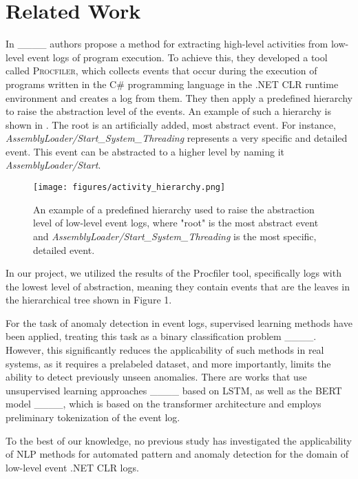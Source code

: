 \section{Related Work}
\label{sec:related}

In ____ authors propose a method for extracting high-level activities from low-level event logs of program execution. To achieve this, they developed a tool called \textsc{Procfiler}, which collects events that occur during the execution of programs written in the C\# programming language in the .NET CLR runtime environment and creates a log from them. They then apply a predefined hierarchy to raise the abstraction level of the events. An example of such a hierarchy is shown in . The root is an artificially added, most abstract event. For instance, \textit{AssemblyLoader/Start\_System\_Threading} represents a very specific and detailed event. This event can be abstracted to a higher level by naming it \textit{AssemblyLoader/Start}.

\begin{figure}
  \centering
  \texttt{[image: figures/activity\_hierarchy.png]}
  \caption{An example of a predefined hierarchy used to raise the abstraction level of low-level event logs, where "root" is the most abstract event and \textit{AssemblyLoader/Start\_System\_Threading} is the most specific, detailed event.}
  \Description{}
  \label{fig:hierarchy}
\end{figure}

In our project, we utilized the results of the Procfiler tool, specifically logs with the lowest level of abstraction, meaning they contain events that are the leaves in the hierarchical tree shown in Figure 1.

For the task of anomaly detection in event logs, supervised learning methods have been applied, treating this task as a binary classification problem ____. However, this significantly reduces the applicability of such methods in real systems, as it requires a prelabeled dataset, and more importantly, limits the ability to detect previously unseen anomalies. There are works that use unsupervised learning approaches ____ based on LSTM, as well as the \textsc{BERT} model ____, which is based on the transformer architecture and employs preliminary tokenization of the event log.

To the best of our knowledge, no previous study has investigated the applicability of NLP methods for automated pattern and anomaly detection for the domain of low-level event .NET CLR logs.